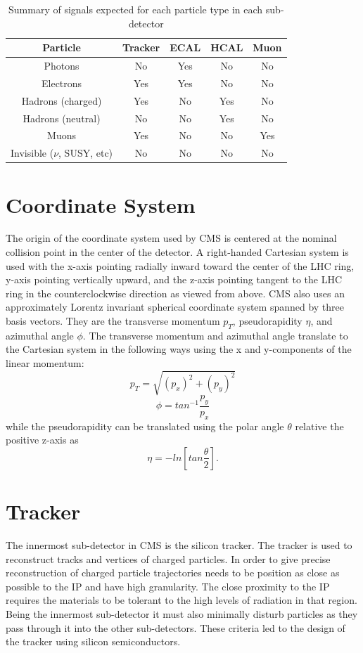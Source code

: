 \begin{table}[h]
	\centering
\begin{tabular}{|c|c|c|c|c|}
	\hline 
	Particle & Tracker & ECAL & HCAL & Muon \\ 
	\hline 
	Photons & No & Yes & No & No \\ 
	\hline 
	Electrons & Yes & Yes & No & No \\ 
	\hline 
	Hadrons (charged) & Yes & No & Yes & No \\ 
	\hline 
	Hadrons (neutral) & No & No & Yes & No \\ 
	\hline 
	Muons & Yes & No & No & Yes \\ 
	\hline 
	Invisible ($\nu$, SUSY, etc) & No & No & No & No \\ 
	\hline 
\end{tabular} 
\caption{Summary of signals expected for each particle type in each sub-detector}
\label{table:subdetsignals}
\end{table}


\section{Coordinate System}
The origin of the coordinate system used by CMS is centered at the nominal collision point in the center of the detector.  A right-handed Cartesian system is used with the x-axis pointing radially inward toward the center of the LHC ring, y-axis pointing vertically upward, and the z-axis pointing tangent to the LHC ring in the counterclockwise direction as viewed from above.  CMS also uses an approximately Lorentz invariant spherical coordinate system spanned by three basis vectors.  They are the transverse momentum $p_{T}$, pseudorapidity $\eta$, and azimuthal angle $\phi$.  The transverse momentum and azimuthal angle translate to the Cartesian system in the following ways using the x and y-components of the linear momentum:
\begin{equation}
p_{T} = \sqrt{(p_{x})^{2} + (p_{y})^{2}}
\end{equation}
\begin{equation}
\phi = tan^{-1}\frac{p_{y}}{p_{x}}
\end{equation}
while the pseudorapidity can be translated using the polar angle $\theta$ relative the positive z-axis as
\begin{equation}
\eta = -ln[tan\frac{\theta}{2}].
\end{equation}


\section{Tracker}
The innermost sub-detector in CMS is the silicon tracker.  The tracker is used to reconstruct tracks and vertices of charged particles.  In order to give precise reconstruction of charged particle trajectories needs to be position as close as possible to the IP and have high granularity.  The close proximity to the IP requires the materials to be tolerant to the high levels of radiation in that region.  Being the innermost sub-detector it must also minimally disturb particles as they pass through it into the other sub-detectors.  These criteria led to the design of the tracker using silicon semiconductors.

